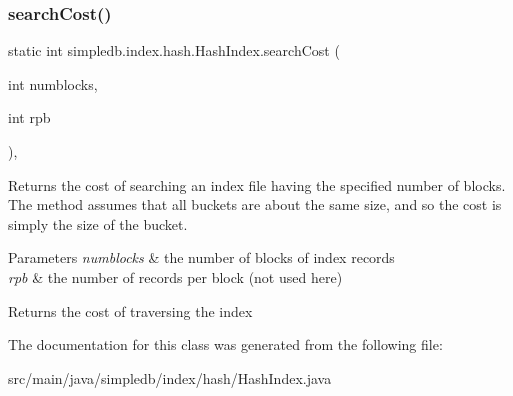 \subsubsection{\texorpdfstring{search\+Cost()}{searchCost()}}
{\footnotesize\ttfamily static int simpledb.\+index.\+hash.\+Hash\+Index.\+search\+Cost (\begin{DoxyParamCaption}\item[{int}]{numblocks,  }\item[{int}]{rpb }\end{DoxyParamCaption})\hspace{0.3cm}{\ttfamily [inline]}, {\ttfamily [static]}}

Returns the cost of searching an index file having the specified number of blocks. The method assumes that all buckets are about the same size, and so the cost is simply the size of the bucket. 
\begin{DoxyParams}{Parameters}
{\em numblocks} & the number of blocks of index records \\
\hline
{\em rpb} & the number of records per block (not used here) \\
\hline
\end{DoxyParams}
\begin{DoxyReturn}{Returns}
the cost of traversing the index 
\end{DoxyReturn}


The documentation for this class was generated from the following file\+:\begin{DoxyCompactItemize}
\item 
src/main/java/simpledb/index/hash/Hash\+Index.\+java\end{DoxyCompactItemize}
